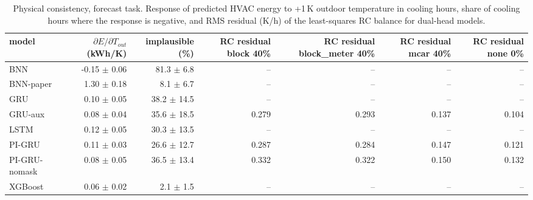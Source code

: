 \begin{table}[H]
\centering\small
\caption{Physical consistency, forecast task. Response of predicted HVAC energy to +1\,K outdoor temperature in cooling hours, share of cooling hours where the response is negative, and RMS residual (K/h) of the least-squares RC balance for dual-head models.}\label{tab:phys_forecast}
\begin{adjustbox}{max width=\textwidth}
\begin{tabular}{lrrrrrr}
\toprule
model & $\partial E/\partial T_{out}$ (kWh/K) & implausible (\%) & RC residual block 40\% & RC residual block\_meter 40\% & RC residual mcar 40\% & RC residual none 0\% \\
\midrule
BNN & -0.15 $\pm$ 0.06 & 81.3 $\pm$ 6.8 & -- & -- & -- & -- \\
BNN-paper & 1.30 $\pm$ 0.18 & 8.1 $\pm$ 6.7 & -- & -- & -- & -- \\
GRU & 0.10 $\pm$ 0.05 & 38.2 $\pm$ 14.5 & -- & -- & -- & -- \\
GRU-aux & 0.08 $\pm$ 0.04 & 35.6 $\pm$ 18.5 & 0.279 & 0.293 & 0.137 & 0.104 \\
LSTM & 0.12 $\pm$ 0.05 & 30.3 $\pm$ 13.5 & -- & -- & -- & -- \\
PI-GRU & 0.11 $\pm$ 0.03 & 26.6 $\pm$ 12.7 & 0.287 & 0.284 & 0.147 & 0.121 \\
PI-GRU-nomask & 0.08 $\pm$ 0.05 & 36.5 $\pm$ 13.4 & 0.332 & 0.322 & 0.150 & 0.132 \\
XGBoost & 0.06 $\pm$ 0.02 & 2.1 $\pm$ 1.5 & -- & -- & -- & -- \\
\bottomrule
\end{tabular}
\end{adjustbox}
\end{table}
